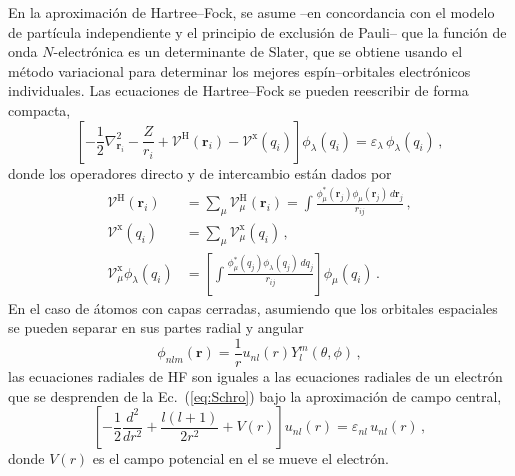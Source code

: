 En la aproximación de Hartree--Fock, se asume --en concordancia con el 
modelo de partícula independiente y el principio de exclusión de Pauli-- 
que la función de onda $N$-electrónica es un determinante de 
Slater, %
que se obtiene usando el método variacional para determinar los mejores 
espín--orbitales electrónicos individuales. 
Las ecuaciones de Hartree--Fock se pueden reescribir de forma compacta, 
\begin{equation}
\left[-\frac{1}{2}\nabla_{\mathbf{r}_i}^2-\frac{Z}{r_i}
+\mathcal{V}^{\mathrm{H}}(\mathbf{r}_i)
-\mathcal{V}^{\mathrm{x}}(q_i) \right]
\phi_{\lambda}(q_i)=\varepsilon_{\lambda}\,\phi_{\lambda}(q_i)\,,
\label{eq:compactHFeqs}
\end{equation}
donde los operadores directo y de intercambio están dados por
\begin{align}
\mathcal{V}^{\mathrm{H}}(\mathbf{r}_i) &
=\sum_\mu \mathcal{V}_\mu^{\mathrm{H}}(\mathbf{r}_i)
=\int\frac{\phi_{\mu}^*(\mathbf{r}_j)\phi_{\mu}(\mathbf{r}_j)\, 
d\mathbf{r}_j}{r_{ij}} \,, \\
\mathcal{V}^{\mathrm{x}}(q_i) 
&=\sum_\mu \mathcal{V}_\mu^{\mathrm{x}}(q_i) \,,\\
\mathcal{V}_\mu^{\mathrm{x}} \phi_{\lambda}(q_i) &= \left[
\int\frac{\phi_{\mu}^*(q_j)\phi_{\lambda}(q_j)\,dq_j}{r_{ij}} \right] 
\phi_\mu(q_i)\,.
\end{align}
En el caso de átomos con capas cerradas, asumiendo que los orbitales 
espaciales se pueden separar en sus partes radial y angular
\begin{equation}
\phi_{nlm}(\mathbf{r})=\frac{1}{r}u_{nl}(r)Y_l^m(\theta,\phi)\,,
\label{eq:centralfield-wave}
\end{equation}
las ecuaciones radiales de HF son iguales a las ecuaciones radiales de 
un electrón que se desprenden de la Ec.~(\ref{eq:Schro}) bajo la 
aproximación de campo central, 
\begin{equation}
 \left[ -\frac{1}{2}\frac{d^2}{dr^2} + \frac{l(l+1)}{2r^2} +
 V(r) \right] u_{nl}(r) = \varepsilon_{nl} \, u_{nl}(r)\,,
\label{eq:eqSchroRadial}
\end{equation}
donde $V(r)$ es el campo potencial en el se mueve el electrón.

